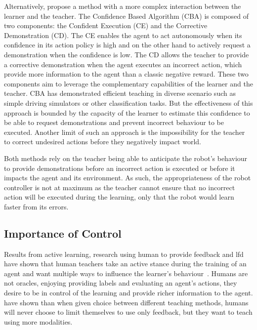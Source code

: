 Alternatively, \cite{chernova2009interactive} propose a method with a more complex interaction between the learner and the teacher. The Confidence Based Algorithm (CBA) is composed of two components: the Confident Execution (CE) and the Corrective Demonstration (CD). The CE enables the agent to act autonomously when its confidence in its action policy is high and on the other hand to actively request a demonstration when the confidence is low. The CD allows the teacher to provide a corrective demonstration when the agent executes an incorrect action, which provide more information to the agent than a classic negative reward. These two components aim to leverage the complementary capabilities of the learner and the teacher. CBA has demonstrated efficient teaching in diverse scenario such as simple driving simulators or other classification tasks. But the effectiveness of this approach is bounded by the capacity of the learner to estimate this confidence to be able to request demonstrations and prevent incorrect behaviour to be executed. Another limit of such an approach is the impossibility for the teacher to correct undesired actions before they negatively impact world. 

Both methods rely on the teacher being able to anticipate the robot's behaviour to provide demonstrations before an incorrect action is executed or before it impacts the agent and its environment. As such, the appropriateness of the robot controller is not at maximum as the teacher cannot ensure that no incorrect action will be executed during the learning, only that the robot would learn faster from its errors.

\subsection{Importance of Control}

Results from active learning, research using human to provide feedback and \gls{lfd} have shown that human teachers take an active stance during the training of an agent and want multiple ways to influence the learner's behaviour~\citep{amershi2014power}. Humans are not oracles, enjoying providing labels and evaluating an agent's actions, they desire to be in control of the learning and provide richer information to the agent. \cite{kaochar2011towards} have shown than when given choice between different teaching methods, humans will never choose to limit themselves to use only feedback, but they want to teach using more modalities.


